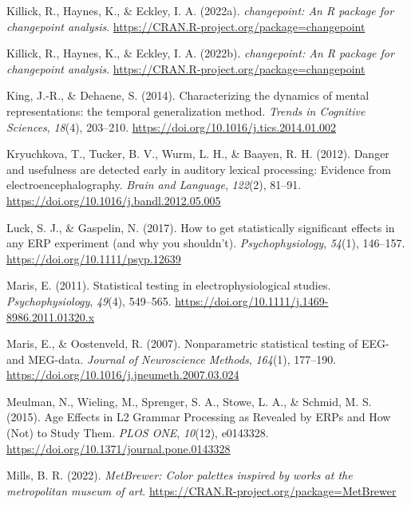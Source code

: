 \documentclass[
  doc,
  floatsintext,
  longtable,
  a4paper,
  nolmodern,
  notxfonts,
  notimes,
  colorlinks=true,linkcolor=blue,citecolor=blue,urlcolor=blue]{apa7}
\newlength{\cslhangindent}
\newenvironment{CSLReferences}[2] %
 {\begin{list}{}{%
  \setlength{\itemindent}{0pt}
  \setlength{\leftmargin}{0pt}
  \setlength{\parsep}{0pt}
  \ifodd #1
   \setlength{\leftmargin}{\cslhangindent}
   \setlength{\itemindent}{-1\cslhangindent}
  \fi
  \setlength{\itemsep}{#2\baselineskip}}}
 {\end{list}}
\begin{document}
\begin{CSLReferences}{1}{0}
Killick, R., Haynes, K., \& Eckley, I. A. (2022a). \emph{{changepoint}:
An {R} package for changepoint analysis}.
\url{https://CRAN.R-project.org/package=changepoint}

Killick, R., Haynes, K., \& Eckley, I. A. (2022b). \emph{{changepoint}:
An {R} package for changepoint analysis}.
\url{https://CRAN.R-project.org/package=changepoint}

King, J.-R., \& Dehaene, S. (2014). Characterizing the dynamics of
mental representations: the temporal generalization method. \emph{Trends
in Cognitive Sciences}, \emph{18}(4), 203--210.
\url{https://doi.org/10.1016/j.tics.2014.01.002}

Kryuchkova, T., Tucker, B. V., Wurm, L. H., \& Baayen, R. H. (2012).
Danger and usefulness are detected early in auditory lexical processing:
Evidence from electroencephalography. \emph{Brain and Language},
\emph{122}(2), 81--91. \url{https://doi.org/10.1016/j.bandl.2012.05.005}

Luck, S. J., \& Gaspelin, N. (2017). How to get statistically
significant effects in any {ERP} experiment (and why you shouldn't).
\emph{Psychophysiology}, \emph{54}(1), 146--157.
\url{https://doi.org/10.1111/psyp.12639}

Maris, E. (2011). Statistical testing in electrophysiological studies.
\emph{Psychophysiology}, \emph{49}(4), 549--565.
\url{https://doi.org/10.1111/j.1469-8986.2011.01320.x}

Maris, E., \& Oostenveld, R. (2007). Nonparametric statistical testing
of EEG- and MEG-data. \emph{Journal of Neuroscience Methods},
\emph{164}(1), 177--190.
\url{https://doi.org/10.1016/j.jneumeth.2007.03.024}

Meulman, N., Wieling, M., Sprenger, S. A., Stowe, L. A., \& Schmid, M.
S. (2015). Age Effects in L2 Grammar Processing as Revealed by ERPs and
How (Not) to Study Them. \emph{PLOS ONE}, \emph{10}(12), e0143328.
\url{https://doi.org/10.1371/journal.pone.0143328}

Mills, B. R. (2022). \emph{{MetBrewer}: Color palettes inspired by works
at the metropolitan museum of art}.
\url{https://CRAN.R-project.org/package=MetBrewer}


\end{CSLReferences}
\end{document}

